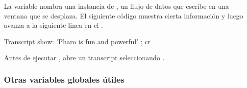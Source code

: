 \documentclass[a4paper,10pt,twoside]{book}
\begin{document}
La variable  nombra una instancia de , un flujo de datos que escribe en una ventana que se desplaza.
El siguiente c\'odigo muestra cierta informaci\'on y luego avanza a la siguiente linea en el .

\begin{code}{}
Transcript show: 'Pharo is fun and powerful' ; cr
\end{code}

\noindent
Antes de ejecutar , abre un transcript seleccionando .


\subsubsection{Otras variables globales \'utiles}
\end{document}
